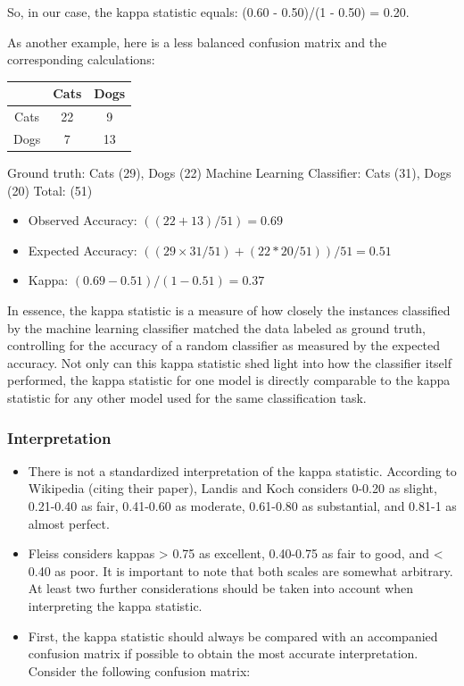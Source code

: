 \documentclass[caret-main.tex]{subfiles}
\begin{document}
So, in our case, the kappa statistic equals: (0.60 - 0.50)/(1 - 0.50) = 0.20.

As another example, here is a less balanced confusion matrix and the corresponding calculations:

\begin{center}
\begin{tabular}{|c|c|c|}
\hline 
    & Cats &Dogs \\ \hline
Cats& 22 & 9 \\ \hline
Dogs& 7  & 13  \\ \hline
\end{tabular} 
\end{center}


Ground truth: Cats (29), Dogs (22) 
Machine Learning Classifier: Cats (31), Dogs (20) 
Total: (51) 

\begin{itemize}
\item Observed Accuracy: $((22 + 13) / 51) = 0.69$ 
\item Expected Accuracy: $((29 \times 31 / 51) + (22 * 20 / 51)) / 51 = 0.51$ 
\item Kappa: $(0.69 - 0.51) / (1 - 0.51) = 0.37$
\end{itemize}
In essence, the kappa statistic is a measure of how closely the instances classified by the machine learning classifier matched the data labeled as ground truth, controlling for the accuracy of a random classifier as measured by the expected accuracy. Not only can this kappa statistic shed light into how the classifier itself performed, the kappa statistic for one model is directly comparable to the kappa statistic for any other model used for the same classification task.

\subsubsection{Interpretation}
\begin{itemize}
\item There is not a standardized interpretation of the kappa statistic. According to Wikipedia (citing their paper), Landis and Koch considers 0-0.20 as slight, 0.21-0.40 as fair, 0.41-0.60 as moderate, 0.61-0.80 as substantial, and 0.81-1 as almost perfect. 

\item Fleiss considers kappas > 0.75 as excellent, 0.40-0.75 as fair to good, and < 0.40 as poor. It is important to note that both scales are somewhat arbitrary. At least two further considerations should be taken into account when interpreting the kappa statistic. 

\item First, the kappa statistic should always be compared with an accompanied confusion matrix if possible to obtain the most accurate interpretation. Consider the following confusion matrix:
\end{itemize}
\end{document}
